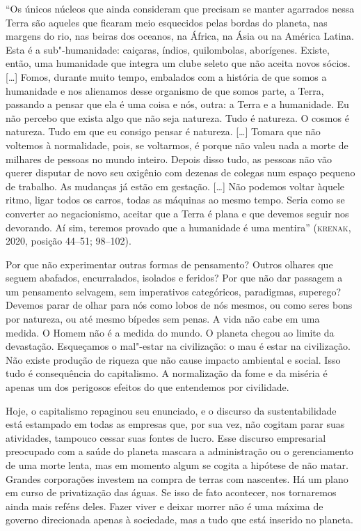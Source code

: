 ``Os únicos núcleos que ainda consideram que precisam se manter
agarrados nessa Terra são aqueles que ficaram meio esquecidos pelas
bordas do planeta, nas margens do rio, nas beiras dos oceanos, na
África, na Ásia ou na América Latina. Esta é a sub"-humanidade: caiçaras,
índios, quilombolas, aborígenes. Existe, então, uma humanidade que
integra um clube seleto que não aceita novos sócios. {[}\ldots{}{]} Fomos,
durante muito tempo, embalados com a história de que somos a humanidade
e nos alienamos desse organismo de que somos parte, a Terra, passando a
pensar que ela é uma coisa e nós, outra: a Terra e a humanidade. Eu não
percebo que exista algo que não seja natureza. Tudo é natureza. O cosmos
é natureza. Tudo em que eu consigo pensar é natureza. {[}\ldots{}{]} Tomara
que não voltemos à normalidade, pois, se voltarmos, é porque não valeu
nada a morte de milhares de pessoas no mundo inteiro. Depois disso tudo,
as pessoas não vão querer disputar de novo seu oxigênio com dezenas de
colegas num espaço pequeno de trabalho. As mudanças já estão em
gestação. {[}\ldots{}{]} Não podemos voltar àquele ritmo, ligar todos os
carros, todas as máquinas ao mesmo tempo. Seria como se converter ao
negacionismo, aceitar que a Terra é plana e que devemos seguir nos
devorando. Aí sim, teremos provado que a humanidade é uma mentira''
(\textsc{krenak}, 2020, posição 44--51; 98--102).

Por que não experimentar outras formas de pensamento? Outros olhares que
seguem abafados, encurralados, isolados e feridos? Por que não dar
passagem a um pensamento selvagem, sem imperativos categóricos,
paradigmas, superego? Devemos parar de olhar para nós como lobos de nós
mesmos, ou como seres bons por natureza, ou até mesmo bípedes sem penas.
A vida não cabe em uma medida. O Homem não é a medida do mundo. O
planeta chegou ao limite da devastação. Esqueçamos o mal"-estar na
civilização: o mau é estar na civilização. Não existe produção de
riqueza que não cause impacto ambiental e social. Isso tudo é
consequência do capitalismo. A normalização da fome e da miséria é
apenas um dos perigosos efeitos do que entendemos por civilidade.

Hoje, o capitalismo repaginou seu enunciado, e o discurso da
sustentabilidade está estampado em todas as empresas que, por sua vez,
não cogitam parar suas atividades, tampouco cessar suas fontes de lucro.
Esse discurso empresarial preocupado com a saúde do planeta mascara a
administração ou o gerenciamento de uma morte lenta, mas em momento
algum se cogita a hipótese de não matar. Grandes corporações investem na
compra de terras com nascentes. Há um plano em curso de privatização das
águas. Se isso de fato acontecer, nos tornaremos ainda mais reféns
deles. Fazer viver e deixar morrer não é uma máxima de governo
direcionada apenas à sociedade, mas a tudo que está inserido no planeta.

